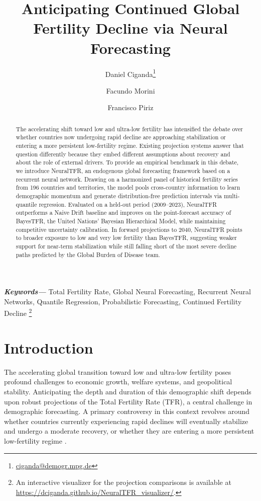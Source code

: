 \documentclass[12pt]{article}
\title{\textbf{Anticipating Continued Global Fertility Decline via Neural Forecasting}}
\author[1,2]{Daniel Ciganda\thanks{\href{mailto:ciganda@demogr.mpg.de}{ciganda@demogr.mpg.de}}}
\author[2]{Facundo Morini}
\author[3]{Francisco Piriz}
\affil[1]{\small Max Planck Institute for Demographic Research}
\affil[2]{\small Statistics Institute, University of the Republic}
\affil[3]{\small Digital Sense}
\date{}
\makeatletter
\providecommand{\keywords}[1]
{
  \vspace{0.5cm}
  \small	
  \textbf{\textit{Keywords---}} #1
}
\let\orig@makefntext\@makefntext
\newcommand{\restore@makefntext}{\let\@makefntext\orig@makefntext}
\newcommand{\titlefootmarkscale}{1.85} %
\newcommand{\settitle@makefntext}{%
  \renewcommand{\@makefntext}[1]{%
    \parindent 1em\noindent
    \hb@xt@1.8em{\hss\textsuperscript{\scalebox{\titlefootmarkscale}{\@thefnmark}}}%
    ##1%
  }%
}
\makeatother
\begin{document}
\makeatletter
\settitle@makefntext
\makeatother
\maketitle
\makeatletter
\restore@makefntext
\makeatother

\begin{abstract}
\noindent The accelerating shift toward low and ultra-low fertility has intensified the debate over whether countries now undergoing rapid decline are approaching stabilization or entering a more persistent low-fertility regime. Existing projection systems answer that question differently because they embed different assumptions about recovery and about the role of external drivers. To provide an empirical benchmark in this debate, we introduce NeuralTFR, an endogenous global forecasting framework based on a recurrent neural network. Drawing on a harmonized panel of historical fertility series from 196 countries and territories, the model pools cross-country information to learn demographic momentum and generate distribution-free prediction intervals via multi-quantile regression. Evaluated on a held-out period (2009--2023), NeuralTFR outperforms a Naive Drift baseline and improves on the point-forecast accuracy of BayesTFR, the United Nations' Bayesian Hierarchical Model, while maintaining competitive uncertainty calibration. In forward projections to 2040, NeuralTFR points to broader exposure to low and very low fertility than BayesTFR, suggesting weaker support for near-term stabilization while still falling short of the most severe decline paths predicted by the Global Burden of Disease team.
\end{abstract}

\keywords{Total Fertility Rate, Global Neural Forecasting, Recurrent Neural Networks, Quantile Regression, Probabilistic Forecasting, Continued Fertility Decline}\footnote{An interactive visualizer for the projection comparisons is available at \url{https://dciganda.github.io/NeuralTFR_visualizer/}.}

\clearpage

\section{Introduction}

The accelerating global transition toward low and ultra-low fertility poses profound challenges to economic growth, welfare systems, and geopolitical stability. Anticipating the depth and duration of this demographic shift depends upon robust projections of the Total Fertility Rate (TFR), a central challenge in demographic forecasting. A primary controversy in this context revolves around whether countries currently experiencing rapid declines will eventually stabilize and undergo a moderate recovery, or whether they are entering a more persistent low-fertility regime \citep[see, e.g.,][]{basten2014future}.
\end{document}
